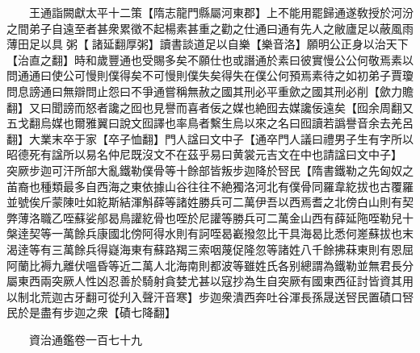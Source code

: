 　　王通詣闕獻太平十二策【隋志龍門縣屬河東郡】上不能用罷歸通遂敎授於河汾之間弟子自遠至者甚衆累徵不起楊素甚重之勸之仕通曰通有先人之敝廬足以蔽風雨薄田足以具粥【諸延翻厚粥】讀書談道足以自樂【樂音洛】願明公正身以治天下【治直之翻】時和歲豐通也受賜多矣不願仕也或譖通於素曰彼實慢公公何敬焉素以問通通曰使公可慢則僕得矣不可慢則僕失矣得失在僕公何預焉素待之如初弟子賈瓊問息謗通曰無辯問止怨曰不爭通嘗稱無赦之國其刑必平重歛之國其刑必削【歛力贍翻】又曰聞謗而怒者讒之囮也見譽而喜者佞之媒也絶囮去媒讒佞遠矣【囮余周翻又五戈翻烏媒也爾雅翼曰說文囮譯也率鳥者繫生烏以來之名曰囮讀若譌譽音余去羌呂翻】大業末卒于家【卒子恤翻】門人諡曰文中子【通卒門人議曰禮男子生有字所以昭德死有諡所以易名仲尼既沒文不在茲乎易曰黄裳元吉文在中也請諡曰文中子】　突厥步迦可汗所部大亂鐵勒僕骨等十餘部皆叛步迦降於唘民【隋書鐵勒之先匈奴之苖裔也種類最多自西海之東依據山谷往往不絶獨洛河北有僕骨同羅韋紇拔也古覆羅並號俟斤蒙陳吐如紇斯結渾斛薛等諸姓勝兵可二萬伊吾以西焉耆之北傍白山則有契弊薄洛職乙咥蘇娑郍曷鳥讙紇骨也咥於尼讙等勝兵可二萬金山西有薛延陁咥勒兒十槃逹契等一萬餘兵康國北傍阿得水則有訶咥曷嶻撥忽比干具海曷比悉何嵳蘇拔也末渴逹等有三萬餘兵得嶷海東有蘇路羯三索咽蔑促隆忽等諸姓八千餘拂菻東則有恩屈阿蘭比褥九離伏嗢昏等近二萬人北海南則都波等雖姓氏各别總謂為鐵勒並無君長分屬東西兩突厥人性凶忍善於騎射貪婪尤甚以寇抄為生自突厥有國東西征討皆資其用以制北荒迦古牙翻可從刋入聲汗音寒】步迦衆潰西奔吐谷渾長孫晟送唘民置磧口唘民於是盡有步迦之衆【磧七降翻】

　　資治通鑑卷一百七十九


    


 


 



 

 
  







 


　　
　　
　
　
　


　　

　















	
	










































